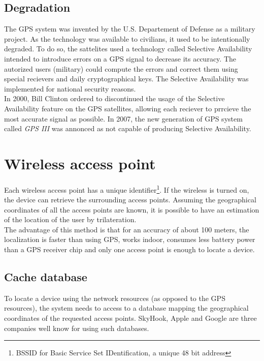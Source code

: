 \subsection{Degradation}

The GPS system was invented by the U.S. Departement of Defense as a military project.
As the technology was available to civilians, it used to be intentionally degraded.
To do so, the sattelites used a technology called Selective Availability intended to introduce errors on a GPS signal to decrease its accuracy.
The autorized users (military) could compute the errors and correct them using special recievers and daily cryptographical keys.
The Selective Availability was implemented for national security reasons.\\

In 2000, Bill Clinton ordered to discontinued the usage of the Selective Availability feature on the GPS satellites, allowing each reciever to prrcieve the most accurate signal as possible. In 2007, the new generation of GPS system called \emph{GPS III} was annonced as not capable of producing Selective Availability\cite{gps-sa}.\\

\section{Wireless access point}
\label{sec:andro-wifi}
Each wireless access point has a unique identifier\footnote{BSSID for Basic Service Set IDentification, a unique 48 bit address}.
If the wireless is turned on, the device can retrieve the surrounding access points.
Assuming the geographical coordinates of all the access points are known, it is possible to have an estimation of the location of the user by trilateration.\\

The advantage of this method is that for an accuracy of about 100 meters, the localization is faster than using GPS, works indoor, consumes less battery power than a GPS receiver chip and only one access point is enough to locate a device.\\

\subsection{Cache database}
\label{sec:andro-cell-db}

To locate a device using the network resources (as opposed to the GPS resources), the system needs to access to a database mapping the geographical coordinates of the requested access points.
SkyHook, Apple and Google are three companies well know for using such databases.\\

